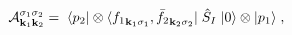 \begin{equation}
{\cal A}^{\sigma_1 \sigma_2}_{{\bf k}_1 {\bf k}_2} =
\; \langle  p_2 \vert \otimes \langle {f_1}_{{\bf k}_1 \sigma_1} , 
\bar {f_2}_{{\bf k}_2 \sigma_2} \vert \;
\hat S_I \;
\vert 0 \rangle \otimes \vert p_1  \rangle \; ,
\label{AMP}
\end{equation}

